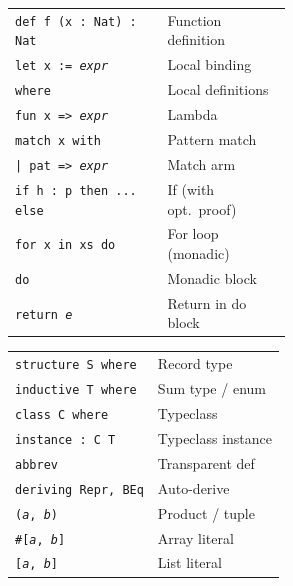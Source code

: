 \documentclass[10pt]{extarticle}
\begin{document}
\begin{multicols}{2}

\begin{tabularx}{\linewidth}{@{}>{\raggedright\arraybackslash}p{0.55\linewidth}@{\enspace}Y@{}}
\texttt{def f (x : Nat) : Nat}   & Function definition \\
\texttt{let x := \textit{expr}}   & Local binding \\
\texttt{where}                    & Local definitions \\
\texttt{fun x => \textit{expr}}   & Lambda \\
\texttt{match x with}             & Pattern match \\
\texttt{| pat => \textit{expr}}   & Match arm \\
\texttt{if h : p then ... else}   & If (with opt.\ proof) \\
\texttt{for x in xs do}           & For loop (monadic) \\
\texttt{do}                       & Monadic block \\
\texttt{return \textit{e}}        & Return in do block \\
\end{tabularx}

\begin{tabularx}{\linewidth}{@{}l@{\enspace}Y@{}}
\texttt{structure S where}        & Record type \\
\texttt{inductive T where}        & Sum type / enum \\
\texttt{class C where}            & Typeclass \\
\texttt{instance : C T}           & Typeclass instance \\
\texttt{abbrev}                   & Transparent def \\
\texttt{deriving Repr, BEq}      & Auto-derive \\
\texttt{(\textit{a}, \textit{b})} & Product / tuple \\
\texttt{\#[\textit{a}, \textit{b}]} & Array literal \\
\texttt{[\textit{a}, \textit{b}]} & List literal \\
\end{tabularx}


\end{multicols}
\end{document}
